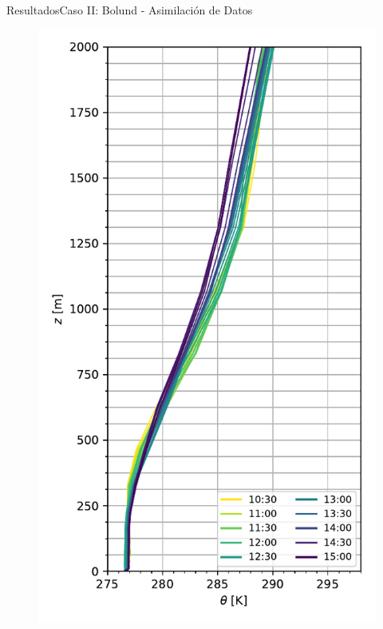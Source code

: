 \documentclass[mathserif,10pt]{beamer}
\begin{document}
\begin{frame}{Resultados}{Caso II: Bolund - Asimilación de Datos}
	\begin{figure}[H]
		\begin{minipage}{0.5\linewidth}
			\centering
			\includegraphics[width=0.75\linewidth,trim={0cm 5mm 0cm 0mm},clip]{fig/06/bol_da/mean_pbl}%
		\end{minipage}%
		\begin{minipage}{0.5\linewidth}

\end{minipage}
\end{figure}
\end{frame}
\end{document}
